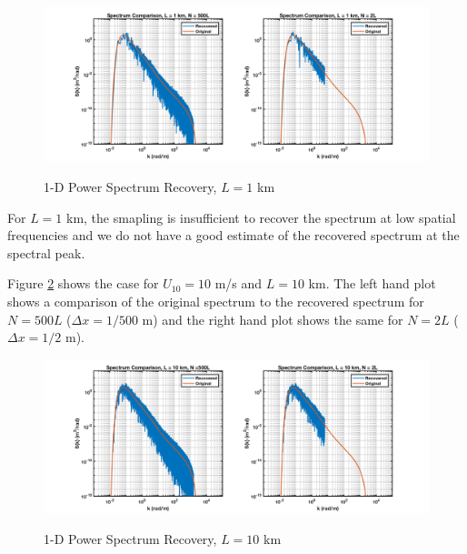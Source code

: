 \begin{figure}[ht]
  \begin{center}
\includegraphics[width=6in]{../media/Ocean_Surface/sea_surface_spectra_1000.png}
  \end{center}
  \renewcommand{\baselinestretch}{1} \small\normalsize
  \begin{quote}
    \caption[1-D Power Spectrum Recovery, $L = 1$ km]{1-D Power Spectrum Recovery, $L = 1$ km\label{os_fig:7bbb}}
  \end{quote}
\end{figure}
\renewcommand{\baselinestretch}{2} \small\normalsize

For $L = 1$ km, the smapling is insufficient to recover the spectrum at low spatial frequencies and we do not have a good estimate of the recovered spectrum at the spectral peak.

Figure \ref{os_fig:7aaa} shows the case for $U_{10} = 10$ m/s and $L = 10$ km. The left hand plot shows a comparison of the original spectrum to the recovered spectrum for $N = 500L$ ($\Delta x = 1/500$ m) and the right hand plot shows the same for $N=2L$ ($\Delta x = 1/2$ m).

\begin{figure}[ht]
  \begin{center}
\includegraphics[width=6in]{../media/Ocean_Surface/sea_surface_spectra_10000.png}
  \end{center}
  \renewcommand{\baselinestretch}{1} \small\normalsize
  \begin{quote}
    \caption[1-D Power Spectrum Recovery, $L = 10$ km]{1-D Power Spectrum Recovery, $L = 10$ km\label{os_fig:7aaa}}
  \end{quote}
\end{figure}
\renewcommand{\baselinestretch}{2} \small\normalsize

